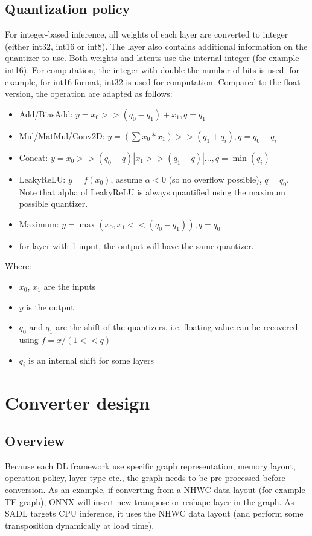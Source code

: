 \documentclass[10pt,a4paper]{article}
\begin{document}
\subsection{Quantization policy}
For integer-based inference, all weights of each layer are converted to integer (either int32, int16 or int8). The layer also contains additional information on the quantizer to use.
Both weights and latents use the internal integer (for example int16). For computation, the integer with double the number of bits is used: for example, for int16 format, int32 is used for computation.
Compared to the float version, the operation are adapted as follows:
\begin{itemize}
\item Add/BiasAdd: $y = x_0>>(q_0-q_1) + x_1, q=q_1$
\item Mul/MatMul/Conv2D: $y = (\sum x_0*x_1)>>(q_1+q_i), q=q_0-q_i$
\item Concat: $y = x_0>>(q_0-q)|x_1>>(q_1-q)|..., q=\min(q_i)$
\item LeakyReLU: $y = f(x_0)$, assume $\alpha < 0$ (so no overflow possible), $q=q_0$. Note that alpha of LeakyReLU is always quantified using the maximum possible quantizer.
\item Maximum: $y = \max(x_0, x_1<<(q_0-q_1)), q=q_0$
\item for layer with 1 input, the output will have the same quantizer.
\end{itemize}
Where:
\begin{itemize}
\item $x_0$, $x_1$ are the inputs
\item $y$ is the output
\item $q_0$ and $q_1$ are the shift of the quantizers, i.e. floating value can be recovered using $f = x/(1<<q)$
\item $q_i$ is an internal shift for some layers
\end{itemize}

\section{Converter design}
\subsection{Overview}
Because each DL framework use specific graph representation, memory layout, operation policy, layer type etc., the graph needs to be pre-processed before conversion. As an example, if converting from a NHWC data layout (for example TF graph), ONNX will insert new transpose or reshape layer in the graph.
As SADL targets CPU inference, it uses the NHWC data layout (and perform some transposition dynamically at load time).
\end{document}

